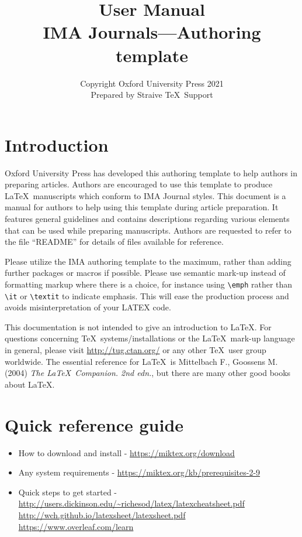 \documentclass{article}
\begin{document}
\title{\bfseries User Manual\\
IMA Journals---Authoring template}

\author{Copyright Oxford University Press 2021\\
\small Prepared by Straive \TeX\ Support}


\maketitle

\tableofcontents

\section{Introduction }
Oxford University Press has developed this authoring template to help authors in preparing articles. Authors are encouraged to use this template to produce \LaTeX\ manuscripts which conform to IMA Journal styles. This document is a manual for authors to help using this template during article preparation. It features general guidelines and contains descriptions regarding various elements that can be used while preparing manuscripts. Authors are requested to refer to the file ``README'' for details of files available for reference.

Please utilize the IMA authoring template to the maximum, rather than
adding further packages or macros if possible. Please use semantic mark-up instead of formatting markup where there is a choice, for instance using \verb+\emph+ rather than \verb+\it+ or \verb+\textit+ to indicate emphasis. This will ease the production process and avoids misinterpretation of your LATEX code.


This documentation is not intended to give an introduction to \LaTeX. For questions concerning \TeX\ systems/installations or the \LaTeX\ mark-up language in general, please visit \url{http://tug.ctan.org/} or any other \TeX\ user group worldwide. The essential reference for \LaTeX\ is Mittelbach F., Goossens M. (2004) \textit{The \LaTeX\ Companion. 2nd edn.}, but there are many other good books about \LaTeX.

\section{Quick reference guide}
\begin{itemize}
\item How to download and install - \url{https://miktex.org/download}
\item Any system requirements - \url{https://miktex.org/kb/prerequisites-2-9}
\item Quick steps to get started -\newline \url{http://users.dickinson.edu/~richesod/latex/latexcheatsheet.pdf}\newline
\url{http://wch.github.io/latexsheet/latexsheet.pdf}\newline
\url{https://www.overleaf.com/learn}
\end{itemize}
\end{document}
